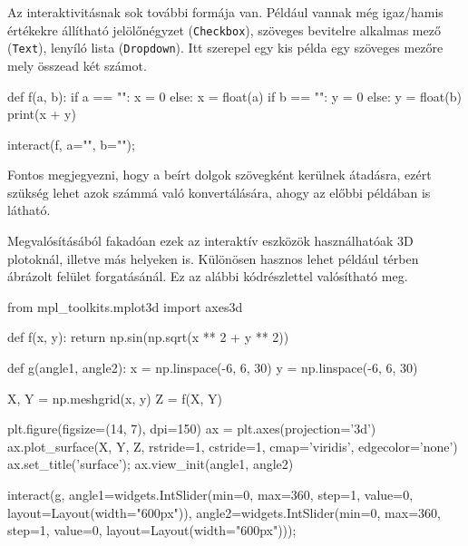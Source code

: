     Az interaktivitásnak sok további formája van. Például
vannak még igaz/hamis értékekre állítható jelölőnégyzet  (\texttt{Checkbox}), szöveges
bevitelre alkalmas mező (\texttt{Text}), lenyíló
lista (\texttt{Dropdown}). Itt szerepel egy kis
példa egy szöveges mezőre mely összead két számot.
\begin{python}
def f(a, b):
    if a == "":
        x = 0
    else:
        x = float(a)
    if b == "":
        y = 0
    else:
        y = float(b)
    print(x + y)

interact(f, a="", b="");
\end{python}
    Fontos megjegyezni, hogy a beírt dolgok szövegként kerülnek átadásra, ezért szükség lehet azok számmá való konvertálására, ahogy az előbbi példában is látható.
    
    Megvalósításából fakadóan ezek az interaktív eszközök használhatóak 3D plotoknál, illetve más helyeken is.
Különösen hasznos lehet például térben ábrázolt felület forgatásánál. Ez az alábbi kódrészlettel valósítható meg.
\begin{python}
from mpl_toolkits.mplot3d import axes3d

def f(x, y):
    return np.sin(np.sqrt(x ** 2 + y ** 2))

def g(angle1, angle2):
    x = np.linspace(-6, 6, 30)
    y = np.linspace(-6, 6, 30)

    X, Y = np.meshgrid(x, y)
    Z = f(X, Y)

    plt.figure(figsize=(14, 7), dpi=150)
    ax = plt.axes(projection='3d')
    ax.plot_surface(X, Y, Z, rstride=1, cstride=1,
                    cmap='viridis', edgecolor='none')
    ax.set_title('surface');
    ax.view_init(angle1, angle2)
    
interact(g,
    angle1=widgets.IntSlider(min=0, max=360, step=1, value=0,
        layout=Layout(width="600px")),
    angle2=widgets.IntSlider(min=0, max=360, step=1, value=0,
        layout=Layout(width="600px")));
\end{python}
